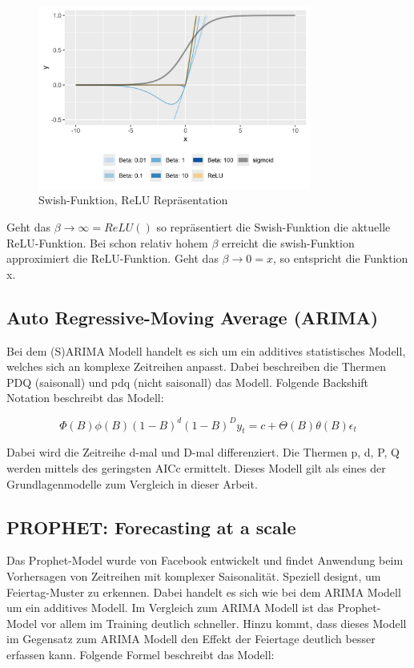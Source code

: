 \documentclass[11pt,ngerman,a4paper,]{article}
\begin{document}
\begin{figure}[H]
\centering
\includegraphics[width=0.8\textwidth]{plots/swish_relu_representation.png}
\caption{Swish-Funktion, ReLU Repräsentation}
\label{fig:swish_rep}
\end{figure}

Geht das \(\beta \to \infty = ReLU()\) so repräsentiert die Swish-Funktion die aktuelle ReLU-Funktion. Bei schon relativ hohem \(\beta\) erreicht die swish-Funktion approximiert die ReLU-Funktion. Geht das \(\beta \to 0 = x\), so entspricht die Funktion x.

\subsection{Auto Regressive-Moving Average (ARIMA)}\label{auto-regressive-moving-average-arima}

Bei dem (S)ARIMA Modell handelt es sich um ein additives statistisches Modell, welches sich an komplexe Zeitreihen anpasst. Dabei beschreiben die Thermen PDQ (saisonall) und pdq (nicht saisonall) das Modell. Folgende Backshift Notation beschreibt
das Modell:

\[
\Phi(B)\phi(B)(1-B)^d (1-B)^D y_t = c + \Theta(B) \theta(B) \epsilon_t
\]

Dabei wird die Zeitreihe d-mal und D-mal differenziert. Die Thermen p, d, P, Q werden mittels des geringsten AICc ermittelt. Dieses Modell gilt als eines der Grundlagenmodelle zum Vergleich in dieser Arbeit. \cite{HyndmanR}

\subsection{PROPHET: Forecasting at a scale}\label{prophet-forecasting-at-a-scale}

Das Prophet-Model wurde von Facebook \cite{taylor2018forecasting} entwickelt und findet Anwendung beim Vorhersagen von Zeitreihen mit komplexer Saisonalität.
Speziell designt, um Feiertag-Muster zu erkennen. Dabei handelt es sich wie bei dem ARIMA Modell um ein additives Modell. Im Vergleich zum ARIMA Modell ist das Prophet-Model vor allem im Training deutlich schneller. Hinzu kommt, dass dieses Modell im Gegensatz zum ARIMA Modell den Effekt der Feiertage deutlich besser erfassen kann. Folgende Formel beschreibt das Modell:
\end{document}
